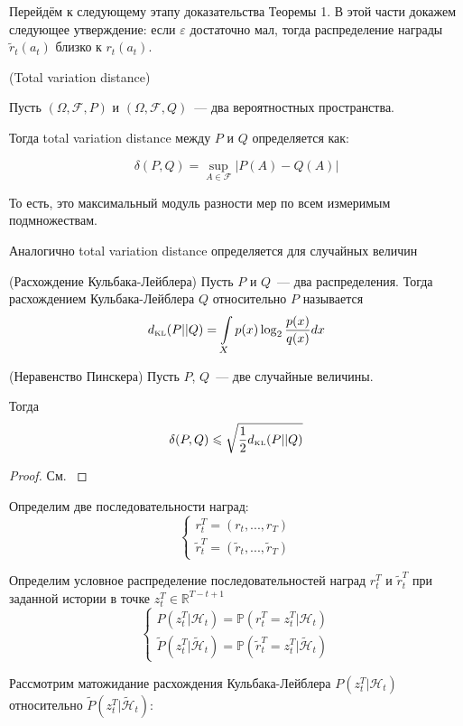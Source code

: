 \documentclass[a4paper]{article}
\newcommand{\Hh}{\mathcal{H}}
\newcommand{\R}{\mathbb{R}}
\newcommand{\dkl}{d_{\mbox{\tiny KL}}}
\newcommand{\ltwo}{\log_2 }
\def\eps{\varepsilon}
\begin{document}
Перейдём к следующему этапу доказательства Теоремы 1. В этой части докажем следующее утверждение: если $\eps$ достаточно мал, тогда распределение награды $\tilde{r}_t(a_t)$ близко к $r_t(a_t)$.

\begin{definition}{(Total variation distance)}

Пусть $(\Omega,\mathcal{F},P)$ и $(\Omega,\mathcal{F},Q)$~--- два вероятностных пространства.

Тогда total variation distance между $P$ и $Q$ определяется как:

$$\delta(P,Q)=\sup\limits_{A\in\mathcal{F}}|P(A)-Q(A)|$$
	
То есть, это максимальный модуль разности мер по всем измеримым подмножествам.

Аналогично total variation distance определяется для случайных величин
\end{definition}

\begin{definition}{(Расхождение Кульбака-Лейблера)}
Пусть $P$ и $Q$~--- два распределения. Тогда расхождением Кульбака-Лейблера $Q$ относительно $P$ называется
$$\dkl(P||Q)=\int\limits_Xp(x)\ltwo\frac{p(x)}{q(x)}dx$$
\end{definition}

\begin{theorem}{(Неравенство Пинскера)}
Пусть $P$, $Q$~--- две случайные величины.

Тогда
$$\delta(P,Q)\leqslant\sqrt{\frac{1}{2}\dkl(P||Q)}$$
\end{theorem}

\begin{proof}
См. \cite{pinsker}
\end{proof}

Определим две последовательности наград:
$$\begin{cases}
r_t^T=(r_t,...,r_T)\\
\tilde{r}_t^T=(\tilde{r}_t,...,\tilde{r}_T)
\end{cases}$$

Определим условное распределение последовательностей наград $r_t^T$ и $\tilde{r}_t^T$ при заданной истории в точке $z_t^T\in\R^{T-t+1}$
$$
\begin{cases}
P(z_t^T|\Hh_t)=\mathbb{P}(r_t^T=z_t^T\big| \Hh_t)\\
\tilde{P}(z_t^T\big|\tilde{\Hh}_t)=\mathbb{P}(\tilde{r}_t^T=z_t^T\big|\tilde{\Hh}_t)
\end{cases}
$$

Рассмотрим матожидание расхождения Кульбака-Лейблера $P(z_t^T|\Hh_t)$ относительно $\tilde{P}(z_t^T|\tilde{\Hh}_t)$:
\end{document}
